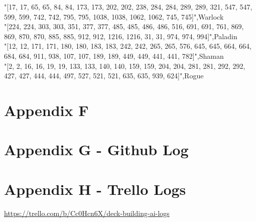 \documentclass{report} %
\begin{document}
{"[17, 17, 65, 65, 84, 84, 173, 173, 202, 202, 238, 284, 284, 289, 289, 321, 547, 547, 599, 599, 742, 742, 795, 795, 1038, 1038, 1062, 1062, 745, 745]",Warlock\\
"[224, 224, 303, 303, 351, 377, 377, 485, 485, 486, 486, 516, 691, 691, 761, 869, 869, 870, 870, 885, 885, 912, 912, 1216, 1216, 31, 31, 974, 974, 994]",Paladin\\
"[12, 12, 171, 171, 180, 180, 183, 183, 242, 242, 265, 265, 576, 645, 645, 664, 664, 684, 684, 911, 938, 107, 107, 189, 189, 449, 449, 441, 441, 782]",Shaman\\
"[2, 2, 16, 16, 19, 19, 133, 133, 140, 140, 159, 159, 204, 204, 281, 281, 292, 292, 427, 427, 444, 444, 497, 527, 521, 521, 635, 635, 939, 624]",Rogue\\
}

\section{Appendix F}

\section{Appendix G - Github Log}

\section{Appendix H - Trello Logs}
\url{https://trello.com/b/Cc0Hcn6X/deck-building-ai-logs}

\end{document}
